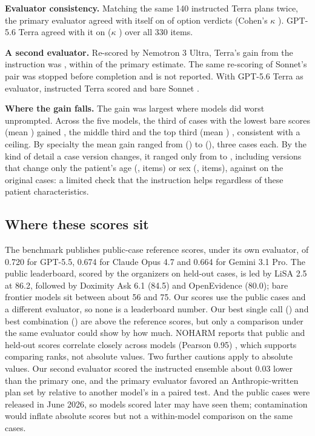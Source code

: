 \documentclass[11pt]{article}
\begin{document}
\textbf{Evaluator consistency.} Matching the same 140 instructed Terra plans twice, the primary
evaluator agreed with itself on \covRetestAgree{} of option verdicts (Cohen's $\kappa$
\covRetestKappa{}). GPT-5.6 Terra agreed with it on \covCrossTerraAgree{} ($\kappa$
\covCrossTerraKappa{}) over all 330 items.

\textbf{A second evaluator.} Re-scored by Nemotron 3 Ultra, Terra's gain from the instruction was
\covDPromptTerraJF{}, within \covInteractionTerraJF{} of the primary estimate. The same re-scoring of
Sonnet's pair was stopped before completion and is not reported. With GPT-5.6 Terra as evaluator,
instructed Terra scored \covFTerraSpecJT{} and bare Sonnet \covFSonnetBareJT{}.

\textbf{Where the gain falls.} The gain was largest where models did worst unprompted. Across the
five models, the third of cases with the lowest bare scores (mean \covTercileLowBare{}) gained
\covTercileLowGain{}, the middle third \covTercileMidGain{} and the top third (mean
\covTercileHighBare{}) \covTercileHighGain{}, consistent with a ceiling. By specialty the mean gain
ranged from \covSpecialtyMin{} (\covSpecialtyMinName) to \covSpecialtyMax{} (\covSpecialtyMaxName),
three cases each. By the kind of detail a case version changes, it ranged only from \covPerturbMin{}
to \covPerturbMax{}, including versions that change only the patient's age (\covPerturbAge{},
\covPerturbAgeItems{} items) or sex (\covPerturbSex{}, \covPerturbSexItems{} items), against
\covPerturbBaseline{} on the original cases: a limited check that the instruction helps regardless of
these patient characteristics.

\subsection{Where these scores sit}
\label{sec:placement}
The benchmark publishes public-case reference scores, under its own evaluator, of 0.720 for GPT-5.5,
0.674 for Claude Opus 4.7 and 0.664 for Gemini 3.1 Pro. The public leaderboard, scored by the
organizers on held-out cases, is led by LiSA 2.5 at 86.2, followed by Doximity Ask 6.1 (84.5) and
OpenEvidence (80.0); bare frontier models sit between about 56 and 75. Our scores use the public cases
and a different evaluator, so none is a leaderboard number. Our best single call
(\covFTerraSpec{}) and best combination (\covFUnionPrompt{}) are above the reference scores, but only
a comparison under the same evaluator could show by how much. NOHARM reports that public and held-out
scores correlate closely across models (Pearson 0.95) \citep{wu2025noharm}, which supports comparing
ranks, not absolute values. Two further cautions apply to absolute values. Our second evaluator scored
the instructed ensemble about 0.03 lower than the primary one, and the primary evaluator favored an
Anthropic-written plan set by \covJudgeInteraction{} relative to another model's in a paired test. And
the public cases were released in June 2026, so models scored later may have seen them;
contamination would inflate absolute scores but not a within-model comparison on the same cases.
\end{document}

